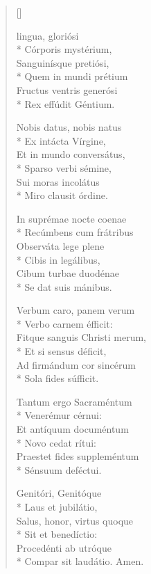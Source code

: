 \newHymn
{}


\begin{verse}[\versewidth]

 lingua, gloriósi \\*
Córporis mystérium,     \\ 
Sanguinísque pretiósi,    \\*  
Quem in mundi prétium     \\
Fructus ventris generósi    \\*
Rex effúdit Géntium.        
\pointtrans                            

Nobis datus, nobis natus    \\*
Ex intácta Vírgine,         \\
Et in mundo conversátus,    \\*
Sparso verbi sémine,        \\
Sui moras incolátus         \\*
Miro clausit órdine.        
                            

In suprémae nocte coenae     \\*
Recúmbens cum frátribus     \\
Observáta lege plene        \\*
Cibis in legálibus,         \\
Cibum turbae duodénae       \\*
Se dat suis mánibus.        

Verbum caro, panem verum    \\*
Verbo carnem éfficit:       \\
Fitque sanguis Christi merum, \\*
Et si sensus déficit,       \\
Ad firmándum cor sincérum   \\*
Sola fides súfficit.        

Tantum ergo Sacraméntum     \\*
Venerémur cérnui:           \\
Et antíquum documéntum      \\*
Novo cedat rítui:           \\
Praestet fides suppleméntum \\*
Sénsuum deféctui.           

Genitóri, Genitóque         \\*
Laus et jubilátio,          \\
Salus, honor, virtus quoque \\*
Sit et benedíctio:          \\
Procedénti ab utróque       \\*
Compar sit laudátio.
Amen. %

\end{verse}

